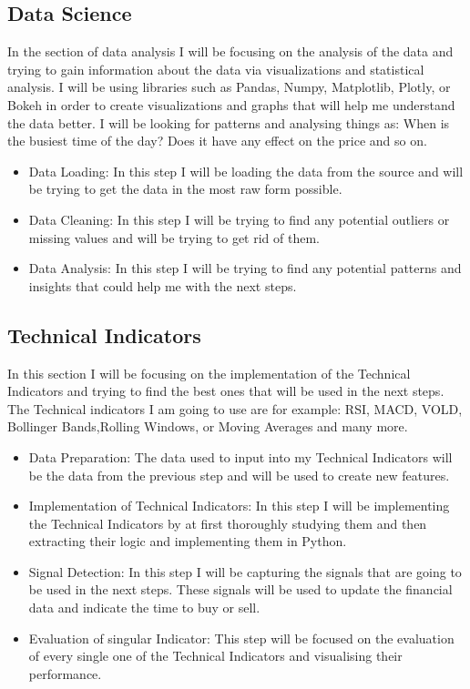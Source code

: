 \documentclass{imc-inf}
\begin{document}
	\subsection{Data Science}
	In the section of data analysis I will be focusing on the analysis of the data and trying to gain information about 
	the data via visualizations and statistical analysis. I will be using libraries such as Pandas, Numpy, Matplotlib, Plotly, or Bokeh 
	in order to create visualizations and graphs that will help me understand the data better. I will be looking for patterns and analysing things as:
	When is the busiest time of the day? Does it have any effect on the price and so on.
	\begin{itemize}
		\item Data Loading: In this step I will be loading the data from the source and will be trying to get the data in the most raw form possible.
		\item Data Cleaning: In this step I will be trying to find any potential outliers or missing values and will be trying to get rid of them.
		\item  Data Analysis: In this step I will be trying to find any potential patterns and insights that could help me with the next steps.
	\end{itemize}

	\subsection{Technical Indicators}
	In this section I will be focusing on the implementation of the Technical Indicators and trying to find the best ones that will be used in the next steps.
	The Technical indicators I am going to use are for example: RSI, MACD, VOLD, Bollinger Bands,Rolling Windows, or Moving Averages and many more.
	\begin{itemize}
		\item Data Preparation: The data used to input into my Technical Indicators will be the data from the previous step and will be used to create new features.
		\item Implementation of Technical Indicators: In this step I will be implementing the Technical Indicators by at first thoroughly studying them and then extracting 
		their logic and implementing them in Python. 
		\item Signal Detection: In this step I will be capturing the signals that are going to be used in the next steps. These signals will be used to update the financial data and indicate the time to buy or sell.
		\item Evaluation of singular Indicator: This step will be focused on the evaluation of every single one of the Technical Indicators and visualising their performance.
	\end{itemize}
\end{document}
